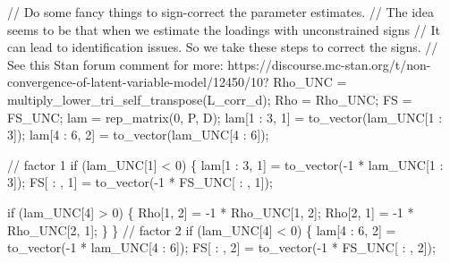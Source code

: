 \documentclass[
  letterpaper,
  DIV=11,
  numbers=noendperiod]{scrreprt}
\newenvironment{Shaded}{\begin{snugshade}}{\end{snugshade}}
\newcommand{\CommentTok}[1]{\textcolor[rgb]{0.37,0.37,0.37}{#1}}
\newcommand{\ControlFlowTok}[1]{\textcolor[rgb]{0.00,0.23,0.31}{#1}}
\newcommand{\DecValTok}[1]{\textcolor[rgb]{0.68,0.00,0.00}{#1}}
\newcommand{\NormalTok}[1]{\textcolor[rgb]{0.00,0.23,0.31}{#1}}
\begin{document}
\begin{Shaded}
\begin{Highlighting}[]
  \CommentTok{// Do some fancy things to sign{-}correct the parameter estimates.}
  \CommentTok{// The idea seems to be that when we estimate the loadings with unconstrained signs}
  \CommentTok{// It can lead to identification issues. So we take these steps to correct the signs.}
  \CommentTok{// See this Stan forum comment for more: https://discourse.mc{-}stan.org/t/non{-}convergence{-}of{-}latent{-}variable{-}model/12450/10?}
\NormalTok{  Rho\_UNC = multiply\_lower\_tri\_self\_transpose(L\_corr\_d);}
\NormalTok{  Rho = Rho\_UNC;}
\NormalTok{  FS = FS\_UNC;}
\NormalTok{  lam = rep\_matrix(}\DecValTok{0}\NormalTok{, P, D);}
\NormalTok{  lam[}\DecValTok{1}\NormalTok{ : }\DecValTok{3}\NormalTok{, }\DecValTok{1}\NormalTok{] = to\_vector(lam\_UNC[}\DecValTok{1}\NormalTok{ : }\DecValTok{3}\NormalTok{]);}
\NormalTok{  lam[}\DecValTok{4}\NormalTok{ : }\DecValTok{6}\NormalTok{, }\DecValTok{2}\NormalTok{] = to\_vector(lam\_UNC[}\DecValTok{4}\NormalTok{ : }\DecValTok{6}\NormalTok{]);}
  
  \CommentTok{// factor 1}
  \ControlFlowTok{if}\NormalTok{ (lam\_UNC[}\DecValTok{1}\NormalTok{] \textless{} }\DecValTok{0}\NormalTok{) \{}
\NormalTok{    lam[}\DecValTok{1}\NormalTok{ : }\DecValTok{3}\NormalTok{, }\DecValTok{1}\NormalTok{] = to\_vector({-}}\DecValTok{1}\NormalTok{ * lam\_UNC[}\DecValTok{1}\NormalTok{ : }\DecValTok{3}\NormalTok{]);}
\NormalTok{    FS[ : , }\DecValTok{1}\NormalTok{] = to\_vector({-}}\DecValTok{1}\NormalTok{ * FS\_UNC[ : , }\DecValTok{1}\NormalTok{]);}
    
    \ControlFlowTok{if}\NormalTok{ (lam\_UNC[}\DecValTok{4}\NormalTok{] \textgreater{} }\DecValTok{0}\NormalTok{) \{}
\NormalTok{      Rho[}\DecValTok{1}\NormalTok{, }\DecValTok{2}\NormalTok{] = {-}}\DecValTok{1}\NormalTok{ * Rho\_UNC[}\DecValTok{1}\NormalTok{, }\DecValTok{2}\NormalTok{];}
\NormalTok{      Rho[}\DecValTok{2}\NormalTok{, }\DecValTok{1}\NormalTok{] = {-}}\DecValTok{1}\NormalTok{ * Rho\_UNC[}\DecValTok{2}\NormalTok{, }\DecValTok{1}\NormalTok{];}
\NormalTok{    \}}
\NormalTok{  \}}
  \CommentTok{// factor 2}
  \ControlFlowTok{if}\NormalTok{ (lam\_UNC[}\DecValTok{4}\NormalTok{] \textless{} }\DecValTok{0}\NormalTok{) \{}
\NormalTok{    lam[}\DecValTok{4}\NormalTok{ : }\DecValTok{6}\NormalTok{, }\DecValTok{2}\NormalTok{] = to\_vector({-}}\DecValTok{1}\NormalTok{ * lam\_UNC[}\DecValTok{4}\NormalTok{ : }\DecValTok{6}\NormalTok{]);}
\NormalTok{    FS[ : , }\DecValTok{2}\NormalTok{] = to\_vector({-}}\DecValTok{1}\NormalTok{ * FS\_UNC[ : , }\DecValTok{2}\NormalTok{]);}
    

\end{Highlighting}
\end{Shaded}
\end{document}
